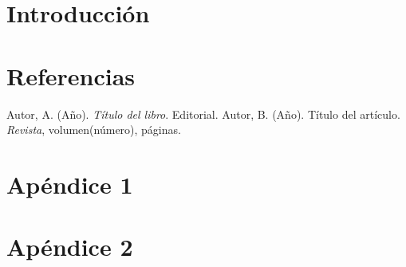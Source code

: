 \documentclass[12pt, letterpaper]{article}
\begin{document}


\tableofcontents
\newpage

\listoffigures
\listoftables
\newpage

\section*{Introducción}





\section*{Referencias}
\begin{thebibliography}{99}
     Autor, A. (Año). \textit{Título del libro}. Editorial.
     Autor, B. (Año). Título del artículo. \textit{Revista}, volumen(número), páginas.
\end{thebibliography}

\begin{appendices}
    \section{Apéndice 1}
    
    \section{Apéndice 2}
\end{appendices}
\end{document}

